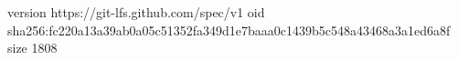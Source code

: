 version https://git-lfs.github.com/spec/v1
oid sha256:fc220a13a39ab0a05c51352fa349d1e7baaa0c1439b5c548a43468a3a1ed6a8f
size 1808
